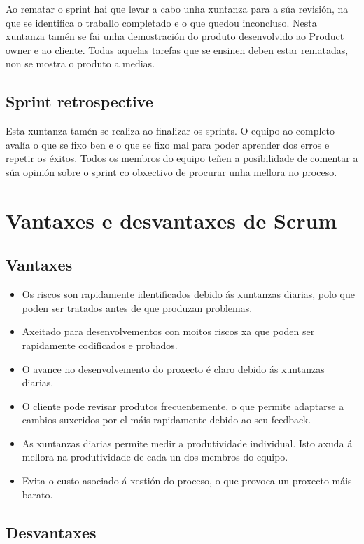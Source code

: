 Ao rematar o sprint hai que levar a cabo unha xuntanza para a súa revisión, na que se identifica o traballo completado e o que quedou inconcluso. Nesta xuntanza tamén se fai unha demostración do produto desenvolvido ao Product owner e ao cliente. Todas aquelas tarefas que se ensinen deben estar rematadas, non se mostra o produto a medias.

\subsection{Sprint retrospective}

Esta xuntanza tamén se realiza ao finalizar os sprints. O equipo ao completo avalía o que se fixo ben e o que se fixo mal para poder aprender dos erros e repetir os éxitos. Todos os membros do equipo teñen a posibilidade de comentar a súa opinión sobre o sprint co obxectivo de procurar unha mellora no proceso.

\section{Vantaxes e desvantaxes de Scrum}

\subsection{Vantaxes}

\begin{itemize}
	\item Os riscos son rapidamente identificados debido ás xuntanzas diarias, polo que poden ser tratados antes de que produzan problemas.
	\item Axeitado para desenvolvementos con moitos riscos xa que poden ser rapidamente codificados e probados.
	\item O avance no desenvolvemento do proxecto é claro debido ás xuntanzas diarias.
	\item O cliente pode revisar produtos frecuentemente, o que permite adaptarse a cambios suxeridos por el máis rapidamente debido ao seu feedback.
	\item As xuntanzas diarias permite medir a produtividade individual. Isto axuda á mellora na produtividade de cada un dos membros do equipo.
	\item Evita o custo asociado á xestión do proceso, o que provoca un proxecto máis barato.
\end{itemize}

\subsection{Desvantaxes}

